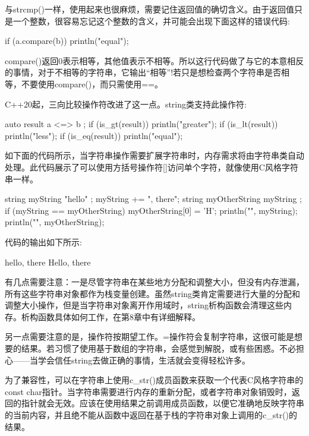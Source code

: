与strcmp()一样，使用起来也很麻烦，需要记住返回值的确切含义。由于返回值只是一个整数，很容易忘记这个整数的含义，并可能会出现下面这样的错误代码:

\begin{cpp}
if (a.compare(b)) { println("equal"); }
\end{cpp}

compare()返回0表示相等，其他值表示不相等。所以这行代码做了与它的本意相反的事情，对于不相等的字符串，它输出“相等”!若只是想检查两个字符串是否相等，不要使用compare()，而只需使用==。

C++20起，三向比较操作符改进了这一点。string类支持此操作符:

\begin{cpp}
auto result { a <=> b };
if (is_gt(result)) { println("greater"); }
if (is_lt(result)) { println("less"); }
if (is_eq(result)) { println("equal"); }
\end{cpp}


如下面的代码所示，当字符串操作需要扩展字符串时，内存需求将由字符串类自动处理。此代码展示了可以使用方括号操作符[]访问单个字符，就像使用C风格字符串一样。

\begin{cpp}
string myString { "hello" };
myString += ", there";
string myOtherString { myString };
if (myString == myOtherString) {
    myOtherString[0] = 'H';
}
println("{}", myString);
println("{}", myOtherString);
\end{cpp}

代码的输出如下所示:

\begin{shell}
hello, there
Hello, there
\end{shell}

有几点需要注意：一是尽管字符串在某些地方分配和调整大小，但没有内存泄漏，所有这些字符串对象都作为栈变量创建。虽然string类肯定需要进行大量的分配和调整大小操作，但是当字符串对象离开作用域时，string析构函数会清理这些内存。析构函数具体如何工作，在第8章中有详细解释。

另一点需要注意的是，操作符按期望工作。=操作符会复制字符串，这很可能是想要的结果。若习惯了使用基于数组的字符串，会感觉到解脱，或有些困惑。不必担心——当学会信任string去做正确的事情，生活就会变得轻松许多。


为了兼容性，可以在字符串上使用c\_str()成员函数来获取一个代表C风格字符串的const char指针。当字符串需要进行内存的重新分配，或者字符串对象销毁时，返回的指针就会无效。应该在使用结果之前调用成员函数，以便它准确地反映字符串的当前内容，并且绝不能从函数中返回在基于栈的字符串对象上调用的c\_str()的结果。

